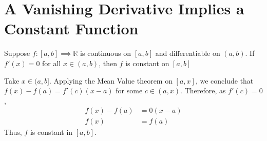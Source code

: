 \documentclass[12pt]{article}
\begin{document}
\newpage
\section{A Vanishing Derivative Implies a Constant Function}
\begin{proposition}{}
    Suppose $f: [a, b] \implies \mathbb R$ is continuous on $[a, b]$ and differentiable on $(a, b)$. If $f'(x) = 0$ for all $x \in (a, b)$, then $f$ is constant on $[a, b]$\\
\end{proposition}
\begin{prf}{}
    Take $x \in (a, b]$. Applying the Mean Value theorem on $[a, x]$, we conclude that $f(x) - f(a) = f'(c)(x - a)$ for some $c \in (a, x)$. Therefore, as $f'(c) = 0$, \\
\begin{align*}
    f(x) - f(a) &= 0(x - a)\\
    f(x) &= f(a)
\end{align*}
Thus, $f$ is constant in $[a, b]$.
\end{prf}
\end{document}
